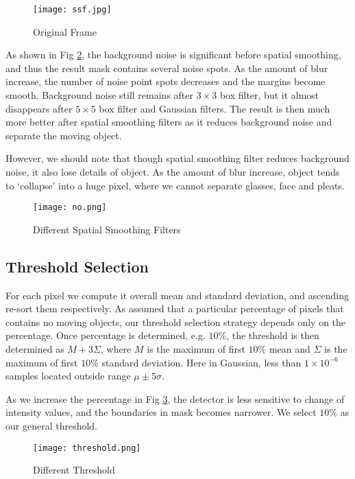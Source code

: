\documentclass[letterpaper, 10 pt, conference]{ieeeconf}
\begin{document}
\begin{figure}[thpb]
\centering
\texttt{[image: ssf.jpg]}
\caption{Original Frame}
\label{ssf} 
\end{figure}

As shown in Fig \ref{dssf}, the background noise is significant before spatial smoothing, and thus the result mask contains several noise spots. As the amount of blur increase, the number of noise point spots decreases and the margins become smooth. Background noise still remains after $3\times3$ box filter, but it almost disappears after $5\times5$ box filter and Gaussian filters. The result is then much more better after spatial smoothing filters as it reduces background noise and separate the moving object. 

However, we should note that though spatial smoothing filter reduces background noise, it also lose details of object. As the amount of blur increase, object tends to `collapse' into a huge pixel, where we cannot separate glasses, face and pleats. 


\begin{figure}[thpb]
\centering
\texttt{[image: no.png]}
\caption{Different Spatial Smoothing Filters}
\label{dssf}
\end{figure}

\subsection{Threshold Selection}
For each pixel we compute it overall mean and standard deviation, and ascending re-sort them respectively. As assumed that a particular percentage of pixels that contains no moving objects, our threshold selection strategy depends only on the percentage. Once percentage is determined, e.g. $10\%$, the threshold is then determined as $M + 3\Sigma$, where $M$ is the maximum of first $10\%$ mean and $\Sigma$ is the maximum of first $10\%$ standard deviation. Here in Gaussian, less than $1\times 10^{-6}$ samples located outside range $\mu\pm5\sigma$.

As we increase the percentage in Fig \ref{threshold}, the detector is less sensitive to change of intensity values, and the boundaries in mask becomes narrower. We select $10\%$ as our general threshold.

\begin{figure}[thpb]
\centering
\texttt{[image: threshold.png]}
\caption{Different Threshold}
\label{threshold}
\end{figure}
\end{document}
